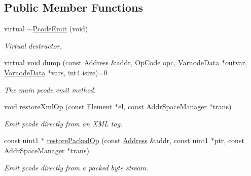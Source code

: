 \subsection*{Public Member Functions}
\begin{DoxyCompactItemize}
\item 
virtual \mbox{\hyperlink{class_pcode_emit_aea571c3fae3b7c2e50947e69352437d1}{$\sim$\+Pcode\+Emit}} (void)
\begin{DoxyCompactList}\small\item\em Virtual destructor. \end{DoxyCompactList}\item 
virtual void \mbox{\hyperlink{class_pcode_emit_a00f25999bbdea677b82577b21bdfff8e}{dump}} (const \mbox{\hyperlink{class_address}{Address}} \&addr, \mbox{\hyperlink{opcodes_8hh_abeb7dfb0e9e2b3114e240a405d046ea7}{Op\+Code}} opc, \mbox{\hyperlink{struct_varnode_data}{Varnode\+Data}} $\ast$outvar, \mbox{\hyperlink{struct_varnode_data}{Varnode\+Data}} $\ast$vars, int4 isize)=0
\begin{DoxyCompactList}\small\item\em The main pcode emit method. \end{DoxyCompactList}\item 
void \mbox{\hyperlink{class_pcode_emit_a7e440d43aba89c358ffcab1f2d88b3db}{restore\+Xml\+Op}} (const \mbox{\hyperlink{class_element}{Element}} $\ast$el, const \mbox{\hyperlink{class_addr_space_manager}{Addr\+Space\+Manager}} $\ast$trans)
\begin{DoxyCompactList}\small\item\em Emit pcode directly from an X\+ML tag. \end{DoxyCompactList}\item 
const uint1 $\ast$ \mbox{\hyperlink{class_pcode_emit_a8136f8c678e250f77907ed57dc6956ac}{restore\+Packed\+Op}} (const \mbox{\hyperlink{class_address}{Address}} \&addr, const uint1 $\ast$ptr, const \mbox{\hyperlink{class_addr_space_manager}{Addr\+Space\+Manager}} $\ast$trans)
\begin{DoxyCompactList}\small\item\em Emit pcode directly from a packed byte stream. \end{DoxyCompactList}\end{DoxyCompactItemize}
